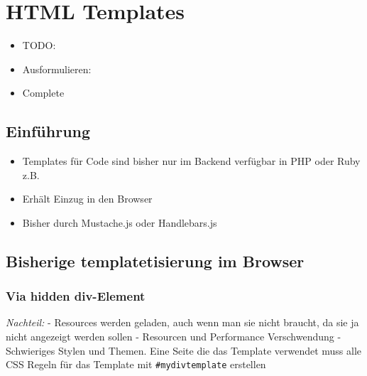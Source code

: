 \section{HTML Templates}\label{html-templates}

\begin{itemize}
\item
  TODO:
\item
  Ausformulieren:
\item
  Complete
\end{itemize}

\subsection{Einführung}\label{einfuxfchrung}

\begin{itemize}
\tightlist
\item
  Templates für Code sind bisher nur im Backend verfügbar in PHP oder
  Ruby z.B.
\item
  Erhält Einzug in den Browser
\item
  Bisher durch Mustache.js oder Handlebars.js
\end{itemize}

\subsection{Bisherige templatetisierung im
Browser}\label{bisherige-templatetisierung-im-browser}

\subsubsection{Via hidden div-Element}\label{via-hidden-div-element}

\begin{Shaded}
\begin{Highlighting}[]
\KeywordTok{>}
    \KeywordTok{>}
\end{Highlighting}
\end{Shaded}

\emph{Nachteil:} - Resources werden geladen, auch wenn man sie nicht
braucht, da sie ja nicht angezeigt werden sollen - Resourcen und
Performance Verschwendung - Schwieriges Stylen und Themen. Eine Seite
die das Template verwendet muss alle CSS Regeln für das Template mit
\texttt{\#mydivtemplate} erstellen

